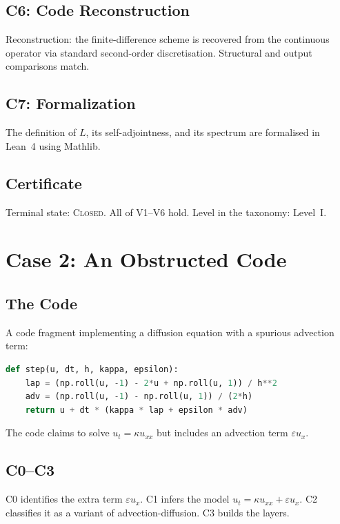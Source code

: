 \documentclass[11pt,a4paper]{article}
\theoremstyle{definition}
\theoremstyle{plain}
\newcommand{\STCLOSED}{\textsc{Closed}}
\begin{document}
\subsection{C6: Code Reconstruction}

Reconstruction: the finite-difference scheme is recovered from the
continuous operator via standard second-order discretisation.
Structural and output comparisons match.

\subsection{C7: Formalization}

The definition of $L$, its self-adjointness, and its spectrum are
formalised in Lean~4 using Mathlib.

\subsection{Certificate}

Terminal state: \STCLOSED. All of V1--V6 hold. Level in the
taxonomy: Level~I.

\section{Case 2: An Obstructed Code}
\label{sec:case-obstr}

\subsection{The Code}

A code fragment implementing a diffusion equation with a spurious
advection term:
\begin{lstlisting}[language=Python]
def step(u, dt, h, kappa, epsilon):
    lap = (np.roll(u, -1) - 2*u + np.roll(u, 1)) / h**2
    adv = (np.roll(u, -1) - np.roll(u, 1)) / (2*h)
    return u + dt * (kappa * lap + epsilon * adv)
\end{lstlisting}

The code claims to solve $u_t = \kappa u_{xx}$ but includes an
advection term $\varepsilon u_x$.

\subsection{C0--C3}

C0 identifies the extra term $\varepsilon u_x$. C1 infers the
model $u_t = \kappa u_{xx} + \varepsilon u_x$. C2 classifies it as
a variant of advection-diffusion. C3 builds the layers.
\end{document}
